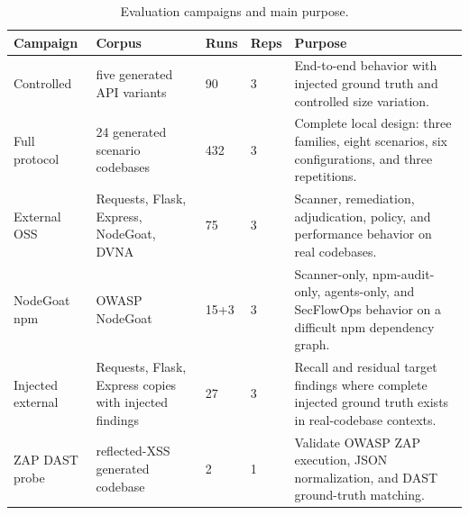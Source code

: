 \begin{table}[t]
\centering
\footnotesize
\caption{Evaluation campaigns and main purpose.}
\label{tab:campaigns}
\begin{tabular}{@{}p{2.7cm}p{3.2cm}p{1.1cm}p{1.1cm}p{6.0cm}@{}}
\toprule
Campaign & Corpus & Runs & Reps & Purpose \\
\midrule
Controlled & five generated API variants & 90 & 3 & End-to-end behavior with injected ground truth and controlled size variation. \\
Full protocol & 24 generated scenario codebases & 432 & 3 & Complete local design: three families, eight scenarios, six configurations, and three repetitions. \\
External OSS & Requests, Flask, Express, NodeGoat, DVNA & 75 & 3 & Scanner, remediation, adjudication, policy, and performance behavior on real codebases. \\
NodeGoat npm & OWASP NodeGoat & 15+3 & 3 & Scanner-only, npm-audit-only, agents-only, and SecFlowOps behavior on a difficult npm dependency graph. \\
Injected external & Requests, Flask, Express copies with injected findings & 27 & 3 & Recall and residual target findings where complete injected ground truth exists in real-codebase contexts. \\
ZAP DAST probe & reflected-XSS generated codebase & 2 & 1 & Validate OWASP ZAP execution, JSON normalization, and DAST ground-truth matching. \\
\bottomrule
\end{tabular}
\end{table}
